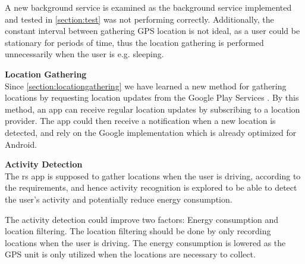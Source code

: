 A new background service is examined as the background service implemented and tested in \ref{section:test} was not performing correctly.
Additionally, the constant interval between gathering GPS location is not ideal, as a user could be stationary for periods of time, thus the location gathering is performed unnecessarily when the user is e.g. sleeping.

\textbf{Location Gathering}\\
Since \ref{section:locationgathering} we have learned a new method for gathering locations by requesting location updates from the Google Play Services \cite{receivingLocationUpdates}.
By this method, an app can receive regular location updates by subscribing to a location provider.
The app could then receive a notification when a new location is detected, and rely on the Google implementation which is already optimized for Android.

\textbf{Activity Detection}\\
The \gls{rs} app is supposed to gather locations when the user is driving, according to the requirements, and hence activity recognition is explored to be able to detect the user's activity and potentially reduce energy consumption.

The activity detection could improve two factors: Energy consumption and location filtering.
The location filtering should be done by only recording locations when the user is driving.
The energy consumption is lowered as the GPS unit is only utilized when the locations are necessary to collect.
